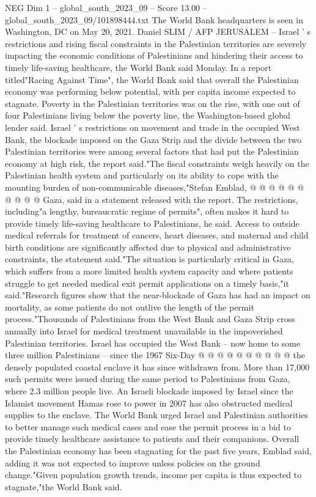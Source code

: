\begin{textsample}{NEG Dim 1 – global\_south\_2023\_09 – Score 13.00 – global\_south\_2023\_09/101898444.txt}  \label{ex:f1_neg_007}
The World Bank headquarters is seen in Washington, DC on May 20, 2021.
Daniel SLIM / AFP JERUSALEM -- Israel ' s restrictions and rising fiscal constraints in the Palestinian territories are severely impacting the economic conditions of Palestinians and hindering their access to timely life-saving healthcare, the World Bank said Monday.
In a report titled"Racing Against Time", the World Bank said that overall the Palestinian economy was performing below potential, with per capita income expected to stagnate.
Poverty in the Palestinian territories was on the rise, with one out of four Palestinians living below the poverty line, the Washington-based global lender said.
Israel ' s restrictions on movement and trade in the occupied West Bank, the blockade imposed on the Gaza Strip and the divide between the two Palestinian territories were among several factors that had put the Palestinian economy at high risk, the report said."The fiscal constraints weigh heavily on the Palestinian health system and particularly on its ability to cope with the mounting burden of non-communicable diseases,"Stefan Emblad, @ @ @ @ @ @ @ @ @ @ Gaza, said in a statement released with the report.
The restrictions, including"a lengthy, bureaucratic regime of permits", often makes it hard to provide timely life-saving healthcare to Palestinians, he said.
Access to outside medical referrals for treatment of cancers, heart diseases, and maternal and child birth conditions are significantly affected due to physical and administrative constraints, the statement said."The situation is particularly critical in Gaza, which suffers from a more limited health system capacity and where patients struggle to get needed medical exit permit applications on a timely basis,"it said."Research figures show that the near-blockade of Gaza has had an impact on mortality, as some patients do not outlive the length of the permit process."Thousands of Palestinians from the West Bank and Gaza Strip cross annually into Israel for medical treatment unavailable in the impoverished Palestinian territories.
Israel has occupied the West Bank -- now home to some three million Palestinians -- since the 1967 Six-Day @ @ @ @ @ @ @ @ @ @ the densely populated coastal enclave it has since withdrawn from.
More than 17,000 such permits were issued during the same period to Palestinians from Gaza, where 2.3 million people live.
An Israeli blockade imposed by Israel since the Islamist movement Hamas rose to power in 2007 has also obstructed medical supplies to the enclave.
The World Bank urged Israel and Palestinian authorities to better manage such medical cases and ease the permit process in a bid to provide timely healthcare assistance to patients and their companions.
Overall the Palestinian economy has been stagnating for the past five years, Emblad said, adding it was not expected to improve unless policies on the ground change."Given population growth trends, income per capita is thus expected to stagnate,"the World Bank said.

\end{textsample}
